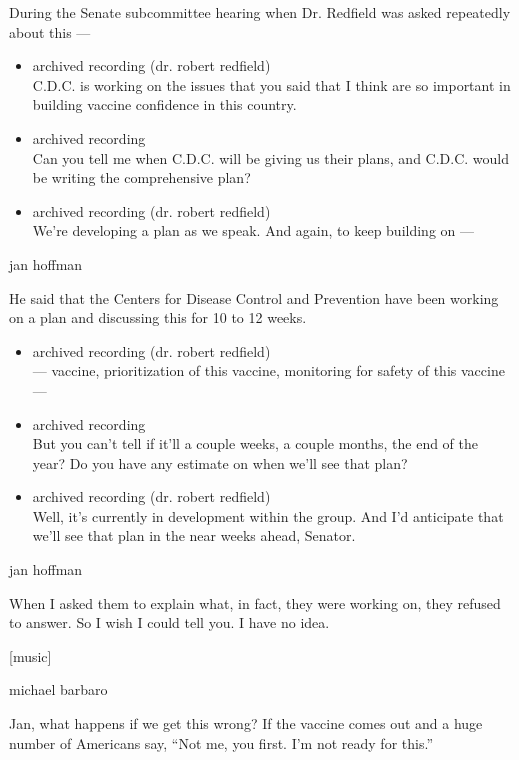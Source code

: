 During the Senate subcommittee hearing when Dr. Redfield was asked
repeatedly about this ---

\begin{itemize}
\item
  archived recording (dr. robert redfield)\\
  C.D.C. is working on the issues that you said that I think are so
  important in building vaccine confidence in this country.
\item
  archived recording\\
  Can you tell me when C.D.C. will be giving us their plans, and C.D.C.
  would be writing the comprehensive plan?
\item
  archived recording (dr. robert redfield)\\
  We're developing a plan as we speak. And again, to keep building on
  ---
\end{itemize}

jan hoffman

He said that the Centers for Disease Control and Prevention have been
working on a plan and discussing this for 10 to 12 weeks.

\begin{itemize}
\item
  archived recording (dr. robert redfield)\\
  --- vaccine, prioritization of this vaccine, monitoring for safety of
  this vaccine ---
\item
  archived recording\\
  But you can't tell if it'll a couple weeks, a couple months, the end
  of the year? Do you have any estimate on when we'll see that plan?
\item
  archived recording (dr. robert redfield)\\
  Well, it's currently in development within the group. And I'd
  anticipate that we'll see that plan in the near weeks ahead, Senator.
\end{itemize}

jan hoffman

When I asked them to explain what, in fact, they were working on, they
refused to answer. So I wish I could tell you. I have no idea.

{[}music{]}

michael barbaro

Jan, what happens if we get this wrong? If the vaccine comes out and a
huge number of Americans say, ``Not me, you first. I'm not ready for
this.''

